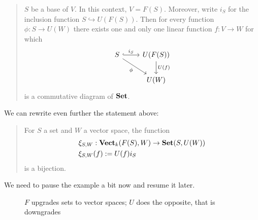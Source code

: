 \begin{example}
\begin{quote}
    \(S\) be a base of \(V\). In this context, \(V = F(S)\). Moreover,
    write \(i_S\) for the inclusion function
    \(S \hookrightarrow U(F(S))\). Then for every function
    \(\phi : S \to U(W)\) there exists one and only one linear function
    \(f : V \to W\) for which
    \[
      \begin{tikzcd}
        S \ar["{i_S}", r, hook] \ar["\phi", dr, swap] & U(F(S)) \ar["U(f)", d] \\
        & U(W)
      \end{tikzcd}
    \]
    is a commutative diagram of \(\mathbf{Set}\).
  \end{quote}
  We can rewrite even further the statement above:
  \begin{quote}
    For \(S\) a set and \(W\) a vector space, the function
    \begin{equation}
      \begin{aligned}
        & \xi_{S,W} : \mathbf{Vect}_k(F(S), W) \to \mathbf{Set}(S, U(W)) \\
        & \xi_{S,W}(f) := U(f)i_S
      \end{aligned}
      \label{function:AdjBijSetVect}
    \end{equation}
    is a bijection.
  \end{quote}
  We need to pause the example a bit now and resume it later.
\end{example}

  \begin{figure}
    \centering
    
    \caption{\(F\) upgrades sets to vector spaces; \(U\) does the
      opposite, that is downgrades}
  \end{figure}

